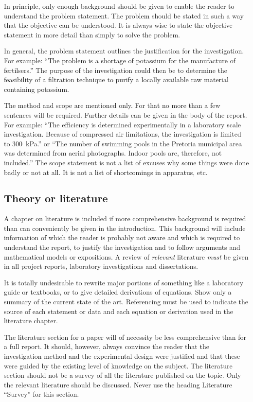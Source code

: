 \documentclass[a5paper, 10pt]{article}
\begin{document}
In principle, only enough background should be given to enable the
reader to understand the problem statement.  The problem should be
stated in such a way that the objective can be understood.
It is always wise to state the objective statement in more detail than simply to solve the problem.

In general, the problem statement outlines the justification for the
investigation.  For example: 
``The problem is a shortage of potassium for the manufacture of fertilsers.'' 
The purpose of the investigation could then be to determine the feasibility of a filtration technique to purify a locally available raw material containing potassium.

The method and scope are mentioned only.  For that no
more than a few sentences will be required.  Further details can be
given in the body of the report.  For example: ``The efficiency is
determined experimentally in a laboratory scale investigation.
Because of compressed air limitations, the investigation is limited to
\SI{300}{\kilo\pascal}.''  or ``The number of swimming pools in the Pretoria
municipal area was determined from aerial photographs.  Indoor pools
are, therefore, not included.''  The scope statement is not a
list of excuses why some things were done badly or not at all.  It is
not a list of shortcomings in apparatus, etc.

\subsection{Theory or literature}
\label{sec:literature}
A chapter on literature is included if more comprehensive background
is required than can conveniently be given in the introduction.  This
background will include information of which the reader is probably
not aware and which is required to understand the report, to justify
the investigation and to follow arguments and mathematical models or
expositions.  A review of \emph{relevant} literature \emph{must} be
given in all project reports, laboratory investigations and
dissertations.

It is totally undesirable to rewrite major portions of something like a
laboratory guide or textbooks, or to give detailed derivations of
equations.  Show only a summary of the current state of the art.
Referencing must be used to indicate the source of each statement or
data and each equation or derivation used in the literature chapter.

The literature section for a paper will of necessity be less
comprehensive than for a full report.  It should, however, always
convince the reader that the investigation method and the experimental
design were justified and that these were guided by the existing level
of knowledge on the subject.  The literature section should
not be a survey of all the literature published on the topic.  Only
the relevant literature should be discussed.  Never use the heading
Literature ``Survey'' for this section.
\end{document}
